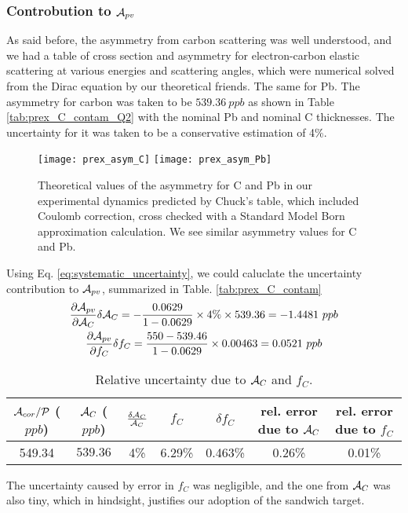 \subsubsection{Controbution to $\mathcal{A}_{pv}$}
As said before, the asymmetry from carbon scattering was well understood, and
we had a table of cross section and asymmetry for electron-carbon elastic scattering
at various energies and scattering angles, which were numerical solved from the Dirac equation
by our theoretical friends. The same for Pb.
The asymmetry for carbon was taken to be $539.36 \ ppb$ as shown in Table \ref{tab:prex_C_contam_Q2}
with the nominal Pb and nominal C thicknesses. The uncertainty for it was taken
to be a conservative estimation of 4\%.
\begin{figure}
    \centering
    \texttt{[image: prex\_asym\_C]}
    \texttt{[image: prex\_asym\_Pb]}
    \caption{Theoretical values of the asymmetry for C and Pb in our experimental 
    dynamics predicted by Chuck's table, which included Coulomb correction, cross
    checked with a Standard Model Born approximation calculation. We see similar
    asymmetry values for C and Pb.}
    \label{prex_asym}
\end{figure}
Using Eq. \ref{eq:systematic_uncertainty}, we could caluclate the uncertainty
contribution to $\mathcal{A}_{pv}$, summarized in Table. \ref{tab:prex_C_contam}
\begin{equation*}
    \begin{gathered}
	\frac{\partial \mathcal{A}_{pv}}{\partial \mathcal{A}_C} \delta \mathcal{A}_C = 
	-\frac{0.0629}{1 - 0.0629} \times 4\% \times 539.36 = -1.4481\ ppb   \\
	\frac{\partial \mathcal{A}_{pv}}{\partial f_C}\delta f_C =
	\frac{550 - 539.46}{1 - 0.0629} \times 0.00463 = 0.0521\ ppb	\\
    \end{gathered}
\end{equation*}

\begin{table}
    \centering
    \begin{tabular}{c | c c | c c | c c}
        \hline
	\thead{$\mathcal{A}_{cor}/\mathcal{P}$ \\ ($ppb$)}   & \thead{$\mathcal{A}_C$ \\ ($ppb$)}   & $\frac{\delta\mathcal{A}_C}{\mathcal{A}_C}$   & $f_C$ & $\delta f_C$  & \thead{rel. error \\ due to $\mathcal{A}_C$ } & \thead{rel. error \\ due to $f_C$}\\
        \hline
	549.34	& $539.36$  & 4\%   & 6.29\%	& 0.463\%   & 0.26\%	& 0.01\% \\
        \hline
    \end{tabular}
    \caption{Relative uncertainty due to $\mathcal{A}_C$ and $f_C$.}
    \label{tab:prex_C_contan}
\end{table}
The uncertainty caused by error in $f_C$ was negligible, and the one from $\mathcal{A}_C$
was also tiny, which in hindsight, justifies our adoption of the sandwich target.

